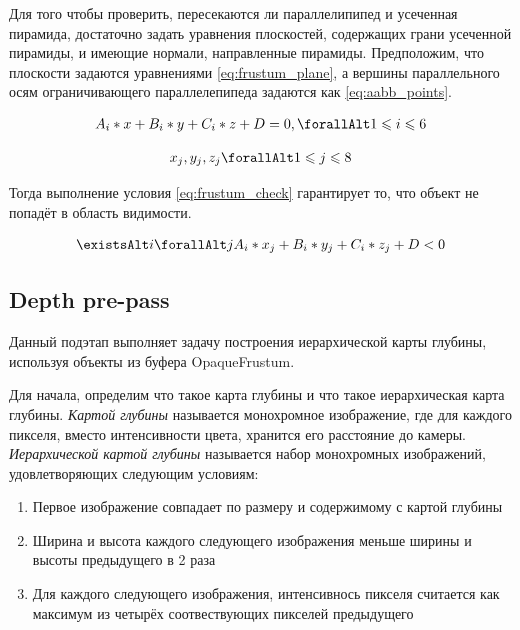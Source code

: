 		Для того чтобы проверить, пересекаются ли параллелипипед и усеченная пирамида, достаточно задать уравнения плоскостей, содержащих грани усеченной пирамиды, и имеющие нормали, направленные  пирамиды. Предположим, что плоскости задаются уравнениями \ref{eq:frustum_plane}, а вершины параллельного осям ограничивающего параллелепипеда задаются как \ref{eq:aabb_points}.
		
		\begin{equation} %
			\label{eq:frustum_plane}
			\begin{multlined}
				A_i * x + B_i * y + C_i * z + D = 0, \forallAlt 1 \le i \le 6 
			\end{multlined}
		\end{equation}
		
		\begin{equation} %
			\label{eq:aabb_points}
			\begin{multlined}
				{x_j, y_j, z_j} \forallAlt 1 \le j \le 8 
			\end{multlined}
		\end{equation}
		
		Тогда выполнение условия \ref{eq:frustum_check} гарантирует то, что объект не попадёт в область видимости.
		
		\begin{equation} %
			\label{eq:frustum_check}
			\begin{multlined}
				\existsAlt i  \forallAlt j A_i * x_j + B_i * y_j + C_i * z_j + D < 0
			\end{multlined}
		\end{equation}
				
	\subsection{Depth pre-pass} \label{ch3:pre_pass:depth}
		Данный подэтап выполняет задачу построения иерархической карты глубины, используя объекты из буфера OpaqueFrustum.
		
		Для начала, определим что такое карта глубины и что такое иерархическая карта глубины. \textit{Картой глубины} называется монохромное изображение, где для каждого пикселя, вместо интенсивности цвета, хранится его расстояние до камеры.  \textit{Иерархической картой глубины} называется набор монохромных изображений, удовлетворяющих следующим условиям:
		\begin{enumerate}[1.]
			\item Первое изображение совпадает по размеру и содержимому с картой глубины
			\item Ширина и высота каждого следующего изображения меньше ширины и высоты предыдущего в 2 раза
			\item Для каждого следующего изображения, интенсивнось пикселя считается как максимум из четырёх соотвествующих пикселей предыдущего
		\end{enumerate}
	
